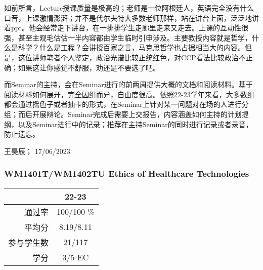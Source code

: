 如前所言，Lecture授课质量是极高的；老师是一位阿根廷人，英语完全没有什么口音，上课激情澎湃；并不是代尔夫特大多数老师那样，站在讲台上面，泛泛地讲着ppt。他会经常走下讲台，在一排排学生走廊里走来又走去。上课的互动性很强，甚至主观毛估估一半内容都由学生临时引申涉及。主要教授内容就是哲学，什么是科学？什么是工程？会讲授百家之言，马克思哲学也占据相当大的内容。但是，这位讲师笔者个人鉴定，政治光谱比较正统红色，对CCP看法比较政治不正确；如果这让你感觉不舒服，劝还是不要选了吧。

而Seminar的主持，会在Seminar进行的前两周提供大概的文档和阅读材料。基于阅读材料如何展开，完全因组而异，自由度很高。依照22-23学年来看，大多数组都会通过摇色子或者抽卡的形式，在Seminar上针对某一问题对在场的人进行分组；而后开展辩论。Seminar完成后需要上交报告，内容涵盖如何主持的计划提纲，以及Seminar进行中的记录；推荐在主持Seminar的同时进行记录或者录音，防止遗忘。

\begin{flushright}
王昊辰； 17/06/2023
\end{flushright}

\subsubsection{WM1401T/WM1402TU Ethics of Healthcare Technologies}
\begin{minipage}{0.45\textwidth}
\centering
{}
\end{minipage}%
\begin{minipage}{0.45\textwidth}
\raggedleft
\begin{tabular}{r|c}
\textbf{ } & \textbf{22-23} \\ \hline
通过率 &100/100 \% \\ 
平均分 & 8.19/8.11 \\ 
参与学生数 &21/117 \\
学分 & 3/5 EC\\
\end{tabular}
\end{minipage}\\

